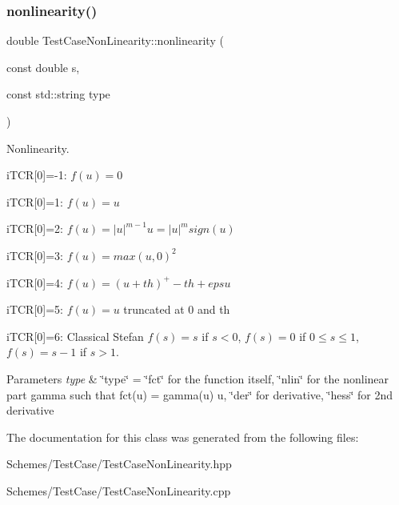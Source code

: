 \subsubsection{\texorpdfstring{nonlinearity()}{nonlinearity()}}
{\footnotesize\ttfamily double Test\+Case\+Non\+Linearity\+::nonlinearity (\begin{DoxyParamCaption}\item[{const double}]{s,  }\item[{const std\+::string}]{type }\end{DoxyParamCaption})}



Nonlinearity. 

i\+T\+CR\mbox{[}0\mbox{]}=-\/1\+: $f(u)=0$

i\+T\+CR\mbox{[}0\mbox{]}=1\+: $f(u)=u$

i\+T\+CR\mbox{[}0\mbox{]}=2\+: $f(u)=|u|^{m-1}u = |u|^m sign(u)$

i\+T\+CR\mbox{[}0\mbox{]}=3\+: $f(u)=max(u,0)^2$

i\+T\+CR\mbox{[}0\mbox{]}=4\+: $f(u)=(u+th)^+-th + eps u$

i\+T\+CR\mbox{[}0\mbox{]}=5\+: $f(u)=u$ truncated at 0 and th

i\+T\+CR\mbox{[}0\mbox{]}=6\+: Classical Stefan $f(s)=s$ if $s<0$, $f(s)=0$ if $0\le s\le 1$, $f(s)=s-1$ if $s>1$. 
\begin{DoxyParams}{Parameters}
{\em type} & \char`\"{}type\char`\"{} = \char`\"{}fct\char`\"{} for the function itself, \char`\"{}nlin\char`\"{} for the nonlinear part gamma such that fct(u) = gamma(u) u, \char`\"{}der\char`\"{} for derivative, \char`\"{}hess\char`\"{} for 2nd derivative \\
\hline
\end{DoxyParams}


The documentation for this class was generated from the following files\+:\begin{DoxyCompactItemize}
\item 
Schemes/\+Test\+Case/Test\+Case\+Non\+Linearity.\+hpp\item 
Schemes/\+Test\+Case/Test\+Case\+Non\+Linearity.\+cpp\end{DoxyCompactItemize}

